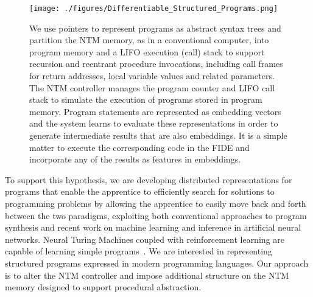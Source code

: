 \begin{figure}
%
  \begin{center} 
    \texttt{[image: ./figures/Differentiable\_Structured\_Programs.png]} %
  \end{center}
%
  \caption{We use pointers to represent programs as abstract syntax trees and partition the NTM memory, as in a conventional computer, into program memory and a LIFO execution (call) stack to support recursion and reentrant procedure invocations, including call frames for return addresses, local variable values and related parameters. The NTM controller manages the program counter and LIFO call stack to simulate the execution of programs stored in program memory. Program statements are represented as embedding vectors and the system learns to evaluate these representations in order to generate intermediate results that are also embeddings. It is a simple matter to execute the corresponding code in the FIDE and incorporate any of the results as features in embeddings.}
%
  \label{fig_programs}
%
\end{figure}


To support this hypothesis, we are developing distributed representations for programs that enable the apprentice to efficiently search for solutions to programming problems by allowing the apprentice to easily move back and forth between the two paradigms, exploiting both conventional approaches to program synthesis and recent work on machine learning and inference in artificial neural networks. Neural Turing Machines coupled with reinforcement learning are capable of learning simple programs~\cite{GravesetalCoRR-14}. We are interested in representing structured programs expressed in modern programming languages. Our approach is to alter the NTM controller and impose additional structure on the NTM memory designed to support procedural abstraction. 

